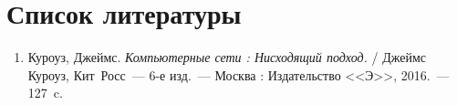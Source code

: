\clearpage                                  %

\chapter*{Список литературы}          


\begin{enumerate}

\item
	Куроуз, Джеймс. \emph{Компьютерные сети : Нисходящий подход.} / Джеймс Куроуз, Кит~Росс~--- 6-е изд.~--- Москва : Издательство <<Э>>, 2016.~--- 127~c.
	
\end{enumerate}


